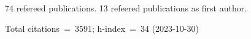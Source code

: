 74 refereed publications. 13 refeered publications as first author.

Total citations~=~3591; h-index~=~34 (2023-10-30)